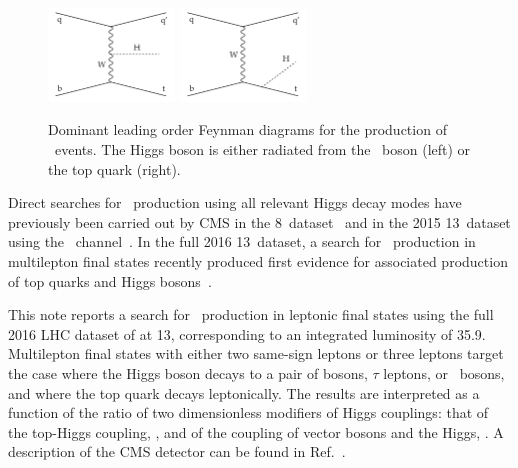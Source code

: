 \begin{figure}[th!]
	\centering
	\includegraphics[width=0.3\textwidth]{Figures/feynman_tHq1.pdf}\hspace{1cm}
	\includegraphics[width=0.3\textwidth]{Figures/feynman_tHq2.pdf}\vspace{.5cm}
	\caption{Dominant leading order Feynman diagrams for the production of \tHq\ events. The Higgs boson is either radiated from the \PW\ boson (left) or the top quark (right).\label{fig:diagrams}}
\end{figure}



Direct searches for \tHq\ production using all relevant Higgs decay modes have previously been carried out by CMS in the 8\TeV\ dataset~\cite{thqpaper} and in the 2015 13\TeV\ dataset using the \Hbb\ channel~\cite{CMS-PAS-HIG-16-019}.
In the full 2016 13\TeV\ dataset, a search for \ttH\ production in multilepton final states recently produced first evidence for associated production of top quarks and Higgs bosons~\cite{PAS-HIG-17-004}.

This note reports a search for \tHq\ production in leptonic final states using the full 2016 LHC dataset of at 13\TeV, corresponding to an integrated luminosity of 35.9\fbinv.
Multilepton final states with either two same-sign leptons or three leptons target the case where the Higgs boson decays to a pair of \W bosons, $\tau$ leptons, or \Z\ bosons, and where the top quark decays leptonically.
The results are interpreted as a function of the ratio of two dimensionless modifiers of Higgs couplings: that of the top-Higgs coupling, \Ct, and of the coupling of vector bosons and the Higgs, \CV.
A description of the CMS detector can be found in Ref.~\cite{Chatrchyan:2008zzk}.

